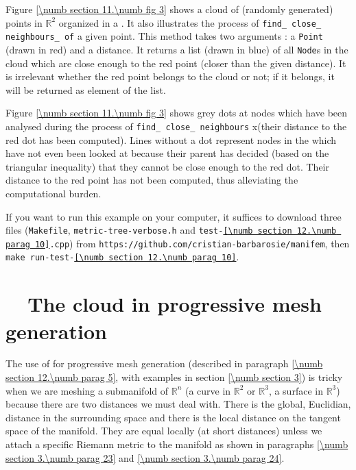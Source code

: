 Figure \ref{\numb section 11.\numb fig 3} shows a cloud of (randomly generated) points in
$ \mathbb{R}^2 $ organized in a {\small\tt{}}.
It also illustrates the process of {\small\tt find\_\,close\_\,neighbours\_\,of} a given point.
This method takes two arguments : a {\small\tt Point} (drawn in red) and a distance.
It returns a list (drawn in blue) of all {\small\tt Node}s in the cloud which are close enough
to the red point (closer than the given distance).
It is irrelevant whether the red point belongs to the cloud or not;
if it belongs, it will be returned as element of the list.

Figure \ref{\numb section 11.\numb fig 3} shows grey dots at nodes which have been analysed
during the process of {\small\tt find\_\,close\_\,neighbours}
x(their distance to the red dot has been computed).
Lines without a dot represent nodes in the {\small\tt{}} which have not even been
looked at because their parent has decided (based on the triangular inequality)
that they cannot be close enough to the red dot.
Their distance to the red point has not been computed, thus alleviating the computational
burden.

If you want to run this example on your computer, it suffices to download three files
({\small\tt Makefile}, {\small\tt metric-tree-verbose.h} and
{\small\tt test-\ref{\numb section 12.\numb parag 10}.cpp}) from\hfil\break
{\small\tt https://github.com/cristian-barbarosie/manifem},\hfil\break
then {\small\tt make run-test-\ref{\numb section 12.\numb parag 10}}.


\section{~~The cloud in progressive mesh generation}\label{\numb section 12.\numb parag 11}

The use of {\small\tt{}} for progressive mesh generation (described in paragraph
\ref{\numb section 12.\numb parag 5}, with examples in section \ref{\numb section 3})
is tricky when we are meshing a submanifold of $ \mathbb{R}^n $
(a curve in $ \mathbb{R}^2 $ or $ \mathbb{R}^3 $, a surface in $ \mathbb{R}^3 $)
because there are two distances we must deal with.
There is the global, Euclidian, distance in the surrounding space
and there is the local distance on the tangent space of the manifold.
They are equal locally (at short distances) unless we attach a specific Riemann metric
to the manifold as shown in paragraphs \ref{\numb section 3.\numb parag 23} and
\ref{\numb section 3.\numb parag 24}.

